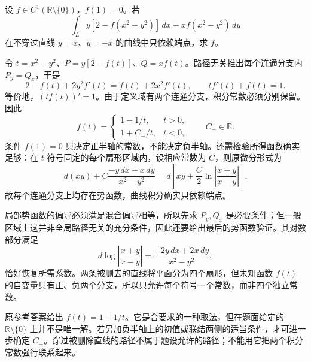 \documentclass[UTF8,12pt,a4paper,fontset=fandol]{ctexart}
\begin{document}
\begin{example}\label{nm-2018-2}
设 $f\in C^1(\mathbb R\setminus\{0\})$，$f(1)=0$。若
\[
 \int_L y[2-f(x^2-y^2)]\,dx+x f(x^2-y^2)\,dy
\]
在不穿过直线 $y=x$、$y=-x$ 的曲线中只依赖端点，求 $f$。
\end{example}
\begin{solve}
令 $t=x^2-y^2$、$P=y[2-f(t)]$、$Q=xf(t)$。路径无关推出每个连通分支内 $P_y=Q_x$，于是
\[
 2-f(t)+2y^2f'(t)=f(t)+2x^2f'(t),\qquad tf'(t)+f(t)=1.
\]
等价地，$(tf(t))'=1$。由于定义域有两个连通分支，积分常数必须分别保留。因此
\[
 f(t)=\begin{cases}1-1/t,&t>0,\\1+C_-/t,&t<0,\end{cases}
 \qquad C_-\in\mathbb R.
\]
条件 $f(1)=0$ 只决定正半轴的常数，不能决定负半轴。还需检验所得函数确实足够：在 $t$ 符号固定的每个扇形区域内，设相应常数为 $C$，则原微分形式为
\[
 d(xy)+C\frac{-y\,dx+x\,dy}{x^2-y^2}
 =d\left[xy+\frac C2\ln\left|\frac{x+y}{x-y}\right|\right].
\]
故每个连通分支上均存在势函数，曲线积分确实只依赖端点。

局部势函数的偏导必须满足混合偏导相等，所以先求 $P_y,Q_x$ 是必要条件；但一般区域上这并非全局路径无关的充分条件，因此还要给出最后的势函数验证。其对数部分满足
\[
d\log\left|\frac{x+y}{x-y}\right|
=\frac{-2y\,dx+2x\,dy}{x^2-y^2},
\]
恰好恢复所需系数。两条被删去的直线将平面分为四个扇形，但未知函数 $f(t)$ 的自变量只有正、负两个分支，所以只允许每个符号一个常数，而非四个独立常数。

\end{solve}
\begin{remark}[对参考答案的条件补充]
原参考答案给出 $f(t)=1-1/t$。它是合要求的一种取法，但在题面给定的 $\mathbb R\setminus\{0\}$ 上并不是唯一解。若另加负半轴上的初值或联结两侧的适当条件，才可进一步确定 $C_-$。穿过被删除直线的路径不属于题设允许的路径；不能用它把两个积分常数强行联系起来。
\end{remark}
\end{document}
